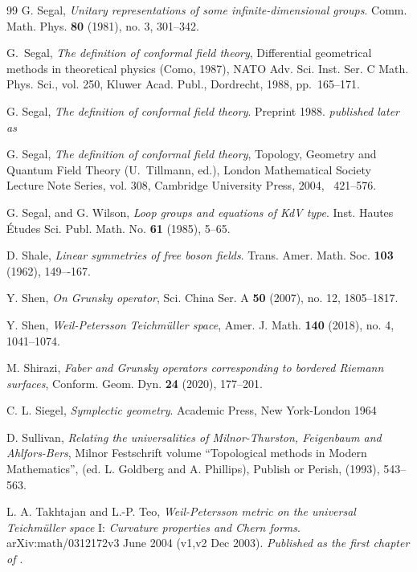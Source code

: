 \documentclass[12pt]{amsart}
\theoremstyle{plain}
\theoremstyle{definition}
\theoremstyle{remark}
\numberwithin{equation}{section} %
\numberwithin{figure}{section} %
\begin{document}
\begin{thebibliography}{99}
 G. Segal, {\it Unitary representations of some infinite-dimensional groups}. Comm. Math. Phys. {\bf 80} (1981), no. 3, 301–342.

G.~Segal, {\it The definition of conformal field theory}, Differential
  geometrical methods in theoretical physics (Como, 1987), NATO Adv. Sci. Inst.
  Ser. C Math. Phys. Sci., vol. 250, Kluwer Acad. Publ., Dordrecht, 1988,
  pp.~165--171.

 G. Segal, {\it The definition of conformal field theory}.
  Preprint 1988.  {\it published later as \cite{SegalPublished}}
  
 G. Segal, 
  {\it The definition of conformal field theory}, Topology, Geometry
  and Quantum Field Theory (U.~Tillmann, ed.), London Mathematical Society
  Lecture Note Series, vol. 308, Cambridge University Press, 2004, ~421--576. 

 G. Segal, and G. Wilson, {\it Loop groups and equations of \emph{KdV} type}. Inst. Hautes Études Sci. Publ. Math. No. {\bf 61} (1985), 5–65.

 D. Shale, {\it Linear symmetries of free boson fields}. Trans. Amer. Math. Soc. {\bf 103} (1962), 149–-167.

 Y. Shen, {\it On Grunsky operator}, Sci. China Ser. A {\bf 50} (2007), no. 12, 1805--1817.

 Y.  Shen, {\it Weil-Petersson Teichm\"uller space}, Amer. J. Math. {\bf 140} (2018), no. 4, 1041–1074.


 M. Shirazi, {\it Faber and Grunsky operators corresponding to bordered Riemann surfaces},
    Conform. Geom. Dyn. {\bf 24} (2020), 177--201. 

 C. L. Siegel, {\it Symplectic geometry}. Academic Press, New York-London 1964

 D. Sullivan, {\it Relating the universalities of Milnor-Thurston, Feigenbaum and Ahlfors-Bers}, Milnor Festschrift volume ``Topological methods in Modern Mathematics'', (ed. L. Goldberg and A. Phillips), Publish or Perish, (1993), 543--563.

 L. A. Takhtajan and L.-P. Teo, {\it Weil-Petersson metric on the universal Teichm\"uller space} I: {\it Curvature properties and Chern forms}.  arXiv:math/0312172v3  June 2004 (v1,v2 Dec 2003).  {\it Published as the first chapter of \cite{Takhtajan_Teo_Memoirs}}.


\end{thebibliography}
\end{document}
